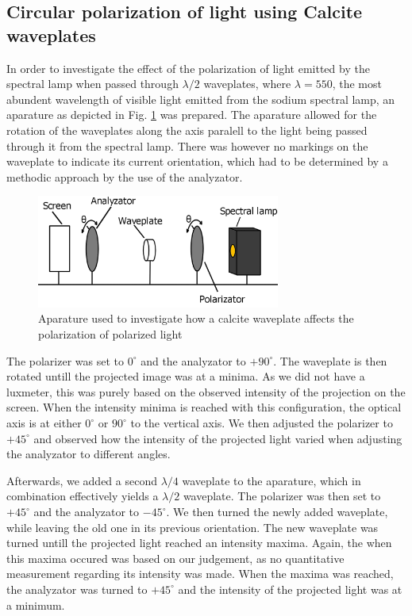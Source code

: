 \documentclass[11pt,a4paper, twocolumn]{article}
\begin{document}
  \subsection{Circular polarization of light using Calcite waveplates}
    In order to investigate the effect of the polarization of light emitted by the spectral lamp when passed through $\lambda /2$ waveplates, where $\lambda=550$, the most abundent wavelength of visible light emitted from the sodium spectral lamp, an aparature as depicted in Fig. \ref{fig:waveplate} was prepared. The aparature allowed for the rotation of the waveplates along the axis paralell to the light being passed through it from the spectral lamp. There was however no markings on the waveplate to indicate its current orientation, which had to be determined by a methodic approach by the use of the analyzator.

    \begin{figure}[H]
      \center
      \includegraphics[width=8cm]{scripts/figs/diagram_6.png}
      \caption{Aparature used to investigate how a calcite waveplate affects the polarization of polarized light}
      \label{fig:waveplate}
    \end{figure}

    The polarizer was set to $0^\circ$ and the analyzator to $+90^\circ$. The waveplate is then rotated untill the projected image was at a minima. As we did not have a luxmeter, this was purely based on the observed intensity of the projection on the screen. When the intensity minima is reached with this configuration, the optical axis is at either $0^\circ$ or $90^\circ$ to the vertical axis. We then adjusted the polarizer to $+45^\circ$ and observed how the intensity of the projected light varied when adjusting the analyzator to different angles.

    Afterwards, we added a second $\lambda/4$ waveplate to the aparature, which in combination effectively yields a $\lambda/2$ waveplate. The polarizer was then set to $+45^\circ$ and the analyzator to $-45^\circ$. We then turned the newly added waveplate, while leaving the old one in its previous orientation. The new waveplate was turned untill the projected light reached an intensity maxima. Again, the when this maxima occured was based on our judgement, as no quantitative measurement regarding its intensity was made. When the maxima was reached, the analyzator was turned to $+45^\circ$ and the intensity of the projected light was at a minimum.
    
\end{document}

